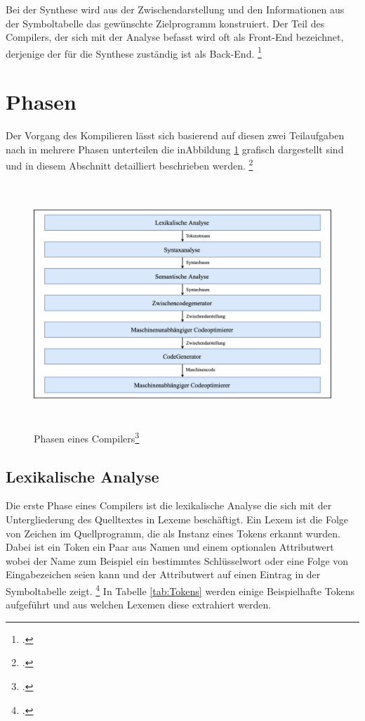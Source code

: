Bei der Synthese wird aus der Zwischendarstellung und den Informationen aus der Symboltabelle das gewünschte Zielprogramm konstruiert. Der Teil des Compilers, der sich mit der Analyse befasst wird oft als Front-End bezeichnet, derjenige der für die Synthese zuständig ist als Back-End.  \footcite[Vgl.][S. 7]{Ullmann2008}

\section{Phasen}
Der Vorgang des Kompilieren lässt sich basierend auf diesen zwei Teilaufgaben nach \citeauthor{Ullmann2008} in mehrere Phasen unterteilen die inAbbildung \ref{fig:Compilerphasen} grafisch dargestellt sind und in diesem Abschnitt detailliert beschrieben werden.  \footcite[Vgl.][S. 6]{Ullmann2008}

\begin{figure}[!ht]
 \includegraphics[width=14.5cm,height=9.15cm]{Images/Compiler/Phasen.png}
 \caption[Phasen eines Compilers]{Phasen eines Compilers\protect\footcite{Ullmann2008}}
 \label{fig:Compilerphasen}
\end{figure}


\subsection{Lexikalische Analyse}
Die erste Phase eines Compilers ist die lexikalische Analyse die sich mit der Untergliederung des Quelltextes in Lexeme beschäftigt.  Ein Lexem ist die Folge von Zeichen im Quellprogramm,  die als Instanz eines Tokens erkannt wurden.  Dabei ist ein Token ein Paar aus Namen und einem optionalen Attributwert wobei der Name zum Beispiel ein bestimmtes Schlüsselwort oder eine Folge von Eingabezeichen seien kann und der Attributwert auf einen Eintrag in der Symboltabelle zeigt.  \footcite[Vgl.][S. 135 f.]{Ullmann2008} In Tabelle \ref{tab:Tokens} werden einige Beispielhafte Tokens aufgeführt und aus welchen Lexemen diese extrahiert werden.

